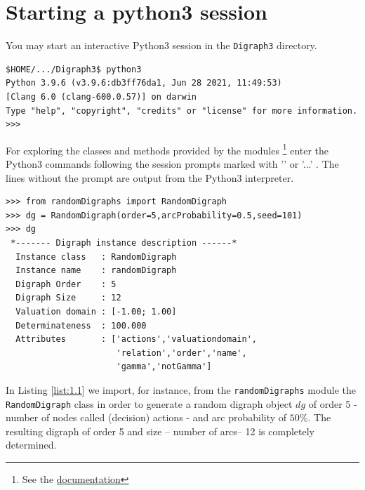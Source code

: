 \section{Starting a \Digraph python3 session}
\label{sec:1.2}
You may start an interactive Python3 session in the \texttt{Digraph3} directory.
\begin{footnotesize}
\begin{verbatim}
$HOME/.../Digraph3$ python3
Python 3.9.6 (v3.9.6:db3ff76da1, Jun 28 2021, 11:49:53) 
[Clang 6.0 (clang-600.0.57)] on darwin
Type "help", "copyright", "credits" or "license" for more information.
>>>
\end{verbatim}
\end{footnotesize}
For exploring the classes and methods provided by the \Digraph modules \footnote{See the \href{https://digraph3.readthedocs.io/en/latest/}{\Digraph documentation}} enter the Python3 commands following the session prompts marked with '\>\>\>' or '...' . The lines without the prompt are output from the Python3 interpreter.
\begin{lstlisting}[caption={Generating a digraph instance},label=list:1.1]
>>> from randomDigraphs import RandomDigraph
>>> dg = RandomDigraph(order=5,arcProbability=0.5,seed=101)
>>> dg
 *------- Digraph instance description ------*
  Instance class   : RandomDigraph
  Instance name    : randomDigraph
  Digraph Order    : 5
  Digraph Size     : 12
  Valuation domain : [-1.00; 1.00]
  Determinateness  : 100.000
  Attributes       : ['actions','valuationdomain',
                      'relation','order','name',
                      'gamma','notGamma']
\end{lstlisting}
In Listing \ref{list:1.1}  we import, for instance, from the \texttt{randomDigraphs} module the \texttt{RandomDigraph} class  in order to generate a random digraph object $dg$ of order 5 - number of nodes called (decision) actions - and arc probability of $50\%$. The resulting digraph of order 5 and size -- number of arcs-- 12 is completely determined.

